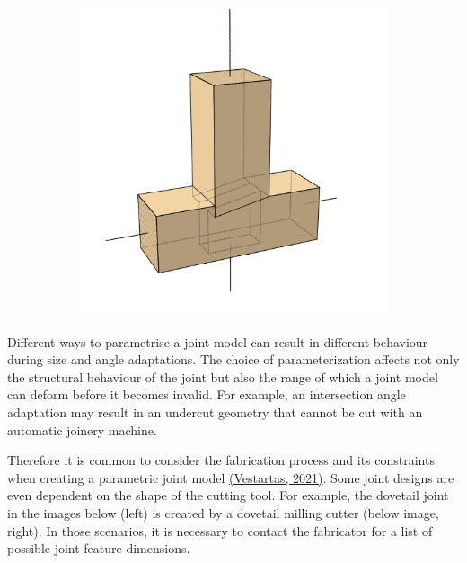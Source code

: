 \documentclass[11pt]{book}
\begin{document}
\begin{figure}[H]
\begin{subfigure}[b]{0.18\textwidth}
\end{subfigure}
\hfill
\begin{subfigure}[b]{0.18\textwidth}
\centering
\includegraphics[width=\textwidth]{./images/image4.jpg}
\end{subfigure}
\end{figure}


Different ways to parametrise a joint model can result in different behaviour during size and angle adaptations. The choice of parameterization affects not only the structural behaviour of the joint but also the range of which a joint model can deform before it becomes invalid. For example, an intersection angle adaptation may result in an undercut geometry that cannot be cut with an automatic joinery machine.

Therefore it is common to consider the fabrication process and its constraints when creating a parametric joint model \href{https://www.zotero.org/google-docs/?mr32kk}{(Vestartas, 2021)}. Some joint designs are even dependent on the shape of the cutting tool. For example, the dovetail joint in the images below (left) is created by a dovetail milling cutter (below image, right). In those scenarios, it is necessary to contact the fabricator for a list of possible joint feature dimensions. 
\end{document}
